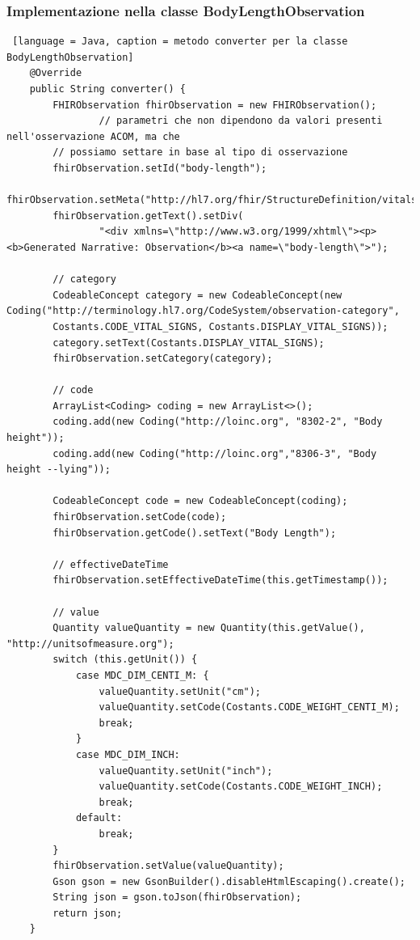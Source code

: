 \documentclass[a4paper]{article}
\begin{document}
\subsubsection*{Implementazione nella classe BodyLengthObservation}
\begin{lstlisting} [language = Java, caption = metodo converter per la classe BodyLengthObservation]
    @Override
    public String converter() {
        FHIRObservation fhirObservation = new FHIRObservation();
                // parametri che non dipendono da valori presenti nell'osservazione ACOM, ma che
        // possiamo settare in base al tipo di osservazione
        fhirObservation.setId("body-length");
        fhirObservation.setMeta("http://hl7.org/fhir/StructureDefinition/vitalsigns");
        fhirObservation.getText().setDiv(
                "<div xmlns=\"http://www.w3.org/1999/xhtml\"><p><b>Generated Narrative: Observation</b><a name=\"body-length\">");
        
        // category
        CodeableConcept category = new CodeableConcept(new Coding("http://terminology.hl7.org/CodeSystem/observation-category",
        Costants.CODE_VITAL_SIGNS, Costants.DISPLAY_VITAL_SIGNS));
        category.setText(Costants.DISPLAY_VITAL_SIGNS);
        fhirObservation.setCategory(category);

        // code
        ArrayList<Coding> coding = new ArrayList<>();
        coding.add(new Coding("http://loinc.org", "8302-2", "Body height"));
        coding.add(new Coding("http://loinc.org","8306-3", "Body height --lying"));
       
        CodeableConcept code = new CodeableConcept(coding);
        fhirObservation.setCode(code);
        fhirObservation.getCode().setText("Body Length");
        
        // effectiveDateTime
        fhirObservation.setEffectiveDateTime(this.getTimestamp());

        // value
        Quantity valueQuantity = new Quantity(this.getValue(), "http://unitsofmeasure.org");
        switch (this.getUnit()) {
            case MDC_DIM_CENTI_M: {
                valueQuantity.setUnit("cm");
                valueQuantity.setCode(Costants.CODE_WEIGHT_CENTI_M);
                break;
            }
            case MDC_DIM_INCH:
                valueQuantity.setUnit("inch");
                valueQuantity.setCode(Costants.CODE_WEIGHT_INCH);
                break;
            default:
                break;
        }
        fhirObservation.setValue(valueQuantity);
        Gson gson = new GsonBuilder().disableHtmlEscaping().create();
        String json = gson.toJson(fhirObservation);
        return json;
    }
\end{lstlisting}
\end{document}
